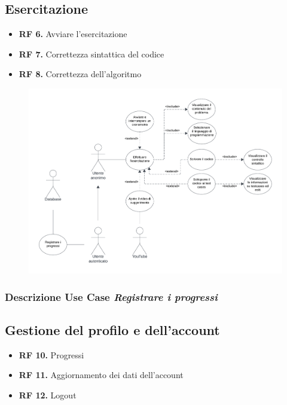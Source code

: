 \documentclass[11pt, a4paper]{article}
\theoremstyle{definition}
\begin{document}
\newpage
\subsection{Esercitazione}
\begin{itemize}
    \item \textbf{RF 6.} Avviare l'esercitazione
    \item \textbf{RF 7.} Correttezza sintattica del codice
    \item \textbf{RF 8.} Correttezza dell'algoritmo
\end{itemize}

\begin{figure}[H]
\centering
\includegraphics[scale=0.57]{materiale/esercitazione.pdf}    
\end{figure}

\subsubsection*{Descrizione Use Case \textit{Registrare i progressi}}

\newpage
\subsection{Gestione del profilo e dell'account}
\begin{itemize}
    \item \textbf{RF 10.} Progressi
    \item \textbf{RF 11.} Aggiornamento dei dati dell'account
    \item \textbf{RF 12.} Logout
\end{itemize}
\end{document}

